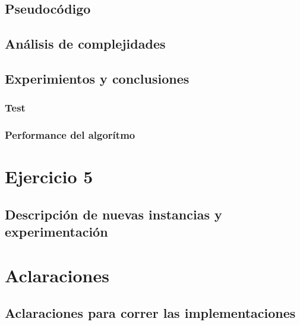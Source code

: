 \documentclass[12pt, a4paper]{article}
\begin{document}
\subsection{Pseudoc\'odigo}

\subsection{An\'alisis de complejidades}

\subsection{Experimientos y conclusiones}
\subsubsection[2.5]{Test}

\subsubsection[2.5]{Performance del algorítmo}


\newpage
\section{Ejercicio 5} 
\subsection{Descripción de nuevas instancias y experimentación}



\newpage
\section{Aclaraciones} 
\subsection{Aclaraciones para correr las implementaciones}

\end{document}
